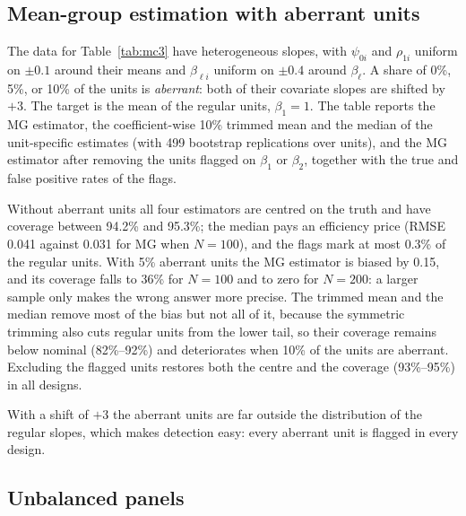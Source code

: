 \subsection{Mean-group estimation with aberrant units}

The data for Table~\ref{tab:mc3} have heterogeneous slopes, with
$\psi_{0i}$ and $\rho_{1i}$ uniform on $\pm0.1$ around their means and
$\beta_{\ell i}$ uniform on $\pm0.4$ around $\beta_\ell$. A share of 0\%,
5\%, or 10\% of the units is \emph{aberrant}: both of their covariate slopes
are shifted by $+3$. The target is the mean of the regular units,
$\beta_1=1$. The table reports the MG estimator, the coefficient-wise 10\%
trimmed mean and the median of the unit-specific estimates (with 499
bootstrap replications over units), and the MG estimator after removing the
units flagged on $\beta_1$ or $\beta_2$, together with the true and false
positive rates of the flags.

\begin{table}[t!]
\centering\scriptsize
{\setlength{\tabcolsep}{4pt}}
\caption{Heterogeneous slopes with aberrant units (slopes shifted by $+3$):
bias, RMSE, and coverage (\%) of nominal 95\% intervals for the centre of
the regular units, $\beta_1=1$, and true / false positive rates (\%) of the
outlier flags. 1{,}000 replications.}
\label{tab:mc3}
\end{table}

Without aberrant units all four estimators are centred on the truth and
have coverage between 94.2\% and 95.3\%; the median pays an efficiency price
(RMSE 0.041 against 0.031 for MG when $N=100$), and the flags mark at most
0.3\% of the regular units. With 5\% aberrant units the MG estimator is
biased by 0.15, and its coverage falls to 36\% for $N=100$ and to zero for
$N=200$: a larger sample only makes the wrong answer more precise. The
trimmed mean and the median remove most of the bias but not all of it,
because the symmetric trimming also cuts regular units from the lower tail,
so their coverage remains below nominal (82\%--92\%) and deteriorates when
10\% of the units are aberrant. Excluding the flagged units restores both
the centre and the coverage (93\%--95\%) in all designs.

With a shift of $+3$ the aberrant units are far outside the distribution of
the regular slopes, which makes detection easy: every aberrant unit is
flagged in every design. 

\subsection{Unbalanced panels}

